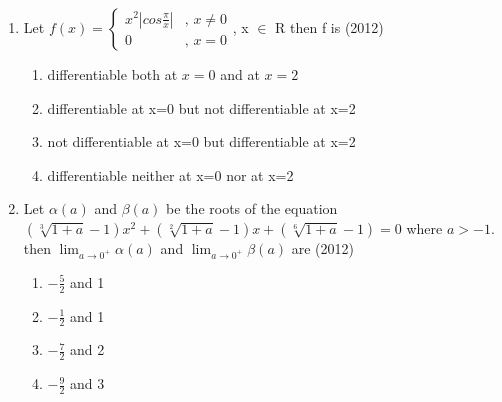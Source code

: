 \documentclass[journal,12pt,twocolumn]{IEEEtran}
\theoremstyle{remark}
\begin{document}
\begin{enumerate}
\item 
Let $f(x) =\begin{cases} x^2|cos \frac{\pi}{x}| & \text{, } x \neq 0 \\ 0 & \text{, } x = 0 
\end{cases}$, x $\in$ R then f is
\hfill{(2012)} 
\begin{enumerate}[label=\alph*)]
    \item differentiable both at $x=0$ and at $x=2$
    \item differentiable at x=0 but not differentiable at x=2
    \item not differentiable at x=0 but differentiable at x=2
    \item differentiable neither at x=0 nor at x=2 \\
\end{enumerate}
\item 
Let $\alpha(a)$ and $\beta(a)$ be the roots of the equation $(\sqrt[3]{1+a}-1)x^2+(\sqrt[2]{1+a}-1)x+(\sqrt[6]{1+a}-1)=0$ where $a>-1$. then $\lim_{a \to 0^+}{\alpha(a)}$ and $\lim_{a \to 0^+}{\beta(a)}$ are
\hfill{(2012)} 

\begin{enumerate}[label=\alph*)]
    \item $-\frac{5}{2}$ and 1
    \item $-\frac{1}{2}$ and 1
    \item $-\frac{7}{2}$ and 2
    \item $-\frac{9}{2}$ and 3 \\
\end{enumerate}


\end{enumerate}
\end{document}
